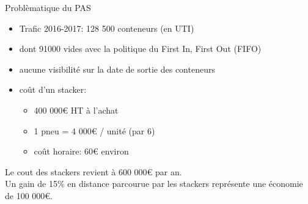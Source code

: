 \begin{frame}{Problèmatique du PAS}
      \begin{itemize}
      \item Trafic 2016-2017: 128 500 conteneurs (en UTI)
      \item dont 91000 vides avec la politique du First In, First Out (FIFO)
      \item aucune visibilité sur la date de sortie des conteneurs
      \item coût d'un stacker:
        \begin{itemize}
        \item 400 000\euro{}  HT à l'achat
        \item 1 pneu = 4 000\euro{} / unit\'e (par 6)
        \item coût horaire: 60\euro{}  environ
        \end{itemize}
      \end{itemize}
      
      Le cout des stackers revient à 600 000\euro{}  par an.\\
      Un gain de 15\% en distance parcourue par les stackers représente une économie de 100 000\euro.
\end{frame}

